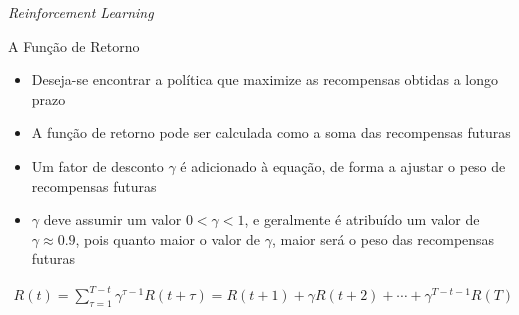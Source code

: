 \documentclass[aspectratio=169]{beamer}
\begin{document}


\begin{frame}{\textit{Reinforcement Learning}}
	\begin{block}{A Função de Retorno}
		\begin{itemize}
			\item Deseja-se encontrar a política que maximize as recompensas obtidas a longo prazo
			\item A função de retorno pode ser calculada como a soma das recompensas futuras
			\item Um fator de desconto $\gamma$ é adicionado à equação, de forma a ajustar o peso de recompensas futuras
			\item $\gamma$ deve assumir um valor $0<\gamma<1$, e geralmente é atribuído um valor de $\gamma\approx0.9$, pois quanto maior o valor de $\gamma$, maior será o peso das recompensas futuras
		\end{itemize}
	\end{block}
	\begin{eqnarray}
		R(t) = \sum^{T-t}_{\tau=1}\gamma^{\tau-1} R(t+\tau) = R(t+1) + \gamma R(t+2) + \cdots + \gamma^{T-t-1}R(T)
		\label{eq:return}
	\end{eqnarray}
\end{frame}
\end{document}
